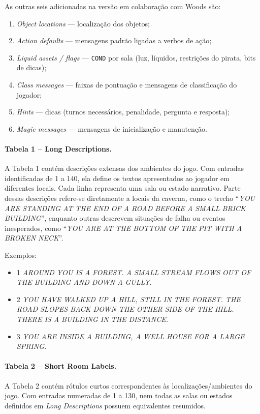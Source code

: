 \documentclass[12pt,a4paper]{article}
\begin{document}
As outras seis adicionadas na versão em colaboração com Woods são:

\begin{enumerate}
  \item \emph{Object locations} — localização dos objetos;
  \item \emph{Action defaults} — mensagens padrão ligadas a verbos de ação;
  \item \emph{Liquid assets / flags} — \texttt{COND} por sala (luz, líquidos, restrições do pirata, bits de dicas);
  \item \emph{Class messages} — faixas de pontuação e mensagens de classificação do jogador;
  \item \emph{Hints} — dicas (turnos necessários, penalidade, pergunta e resposta);
  \item \emph{Magic messages} — mensagens de inicialização e manutenção.
\end{enumerate}

\paragraph{Tabela 1 – Long Descriptions.}  
A Tabela 1 contém descrições extensas dos ambientes do jogo. Com entradas identificadas de 1 a 140, ela define os textos apresentados ao jogador em diferentes locais. Cada linha representa uma sala ou estado narrativo. Parte dessas descrições refere-se diretamente a locais da caverna, como o trecho “\textit{YOU ARE STANDING AT THE END OF A ROAD BEFORE A SMALL BRICK BUILDING}”, enquanto outras descrevem situações de falha ou eventos inesperados, como “\textit{YOU ARE AT THE BOTTOM OF THE PIT WITH A BROKEN NECK}”.  

Exemplos:  
\begin{itemize}
    \item 1	\textit{AROUND YOU IS A FOREST.  A SMALL STREAM FLOWS OUT OF THE BUILDING AND DOWN A GULLY}.
    \item 2	\textit{YOU HAVE WALKED UP A HILL, STILL IN THE FOREST.  THE ROAD SLOPES BACK DOWN THE OTHER SIDE OF THE HILL.  THERE IS A BUILDING IN THE DISTANCE.}
    \item 3	\textit{YOU ARE INSIDE A BUILDING, A WELL HOUSE FOR A LARGE SPRING.}
\end{itemize}

\paragraph{Tabela 2 – Short Room Labels.}  
A Tabela 2 contém rótulos curtos correspondentes às localizações/ambientes do jogo. Com entradas numeradas de 1 a 130, nem todas as salas ou estados definidos em \textit{Long Descriptions} possuem equivalentes resumidos.  
\end{document}
